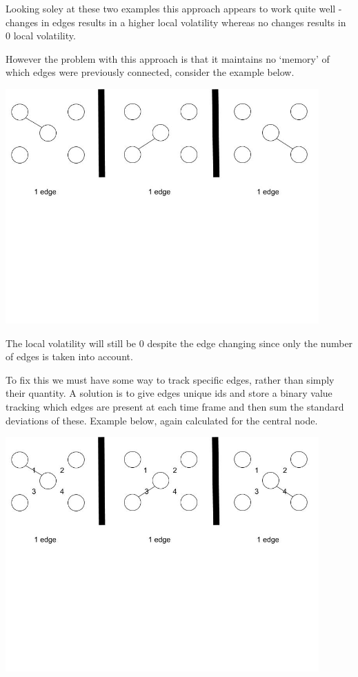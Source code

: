 Looking soley at these two examples this approach appears to work quite well - changes in edges results in a higher local volatility whereas no changes results in 0 local volatility.

However the problem with this approach is that it maintains no ‘memory’ of which edges were previously connected, consider the example below.
\begin{center}
\includegraphics[trim={0 10cm 0 -1cm}, width=120mm]{./Figures/volatility3.jpg}
\end{center}

The local volatility will still be 0 despite the edge changing since only the number of edges is taken into account.

To fix this we must have some way to track specific edges, rather than simply their quantity. A solution is to give edges unique ids and store a binary value tracking which edges are present at each time frame and then sum the standard deviations of these. Example below, again calculated for the central node.

\begin{center}
\includegraphics[trim={0 10cm 0 -1cm}, width=120mm]{./Figures/volatility4.jpg}
\end{center}

